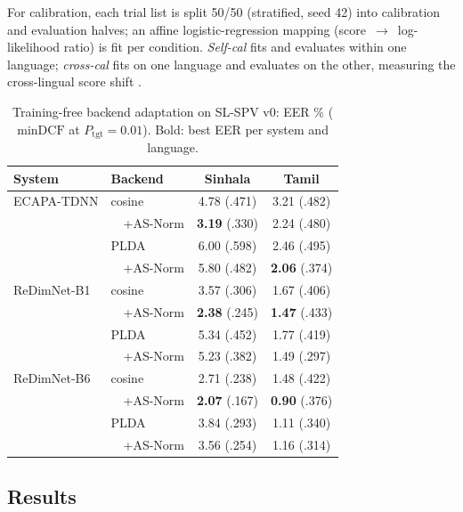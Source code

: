 \documentclass[journal]{IEEEtran}
\newcommand{\dcf}{\mathrm{minDCF}}
\begin{document}
For calibration, each trial list is split 50/50 (stratified, seed 42)
into calibration and evaluation halves; an affine logistic-regression
mapping (score~$\to$~log-likelihood ratio) is fit per condition.
\emph{Self-cal} fits and evaluates within one language;
\emph{cross-cal} fits on one language and evaluates on the other,
measuring the cross-lingual score shift \cite{thienpondt2022tackling}.

\begin{table}[!t]
\renewcommand{\arraystretch}{1.1}
\caption{Training-free backend adaptation on SL-SPV v0:
EER \% ($\dcf$ at $P_{\mathrm{tgt}}{=}0.01$). Bold: best EER per
system and language.}
\label{tab:backend}
\centering
\small
\setlength{\tabcolsep}{5pt}
\begin{tabular}{l l c c}
\toprule
\textbf{System} & \textbf{Backend} & \textbf{Sinhala} & \textbf{Tamil} \\
\midrule
ECAPA-TDNN  & cosine          & 4.78 (.471) & 3.21 (.482) \\
            & \ \ +AS-Norm    & \textbf{3.19} (.330) & 2.24 (.480) \\
            & PLDA            & 6.00 (.598) & 2.46 (.495) \\
            & \ \ +AS-Norm    & 5.80 (.482) & \textbf{2.06} (.374) \\
\midrule
ReDimNet-B1 & cosine          & 3.57 (.306) & 1.67 (.406) \\
            & \ \ +AS-Norm    & \textbf{2.38} (.245) & \textbf{1.47} (.433) \\
            & PLDA            & 5.34 (.452) & 1.77 (.419) \\
            & \ \ +AS-Norm    & 5.23 (.382) & 1.49 (.297) \\
\midrule
ReDimNet-B6 & cosine          & 2.71 (.238) & 1.48 (.422) \\
            & \ \ +AS-Norm    & \textbf{2.07} (.167) & \textbf{0.90} (.376) \\
            & PLDA            & 3.84 (.293) & 1.11 (.340) \\
            & \ \ +AS-Norm    & 3.56 (.254) & 1.16 (.314) \\
\bottomrule
\end{tabular}
\end{table}

\subsection{Results}
\label{ssec:adaptresults}
\end{document}
